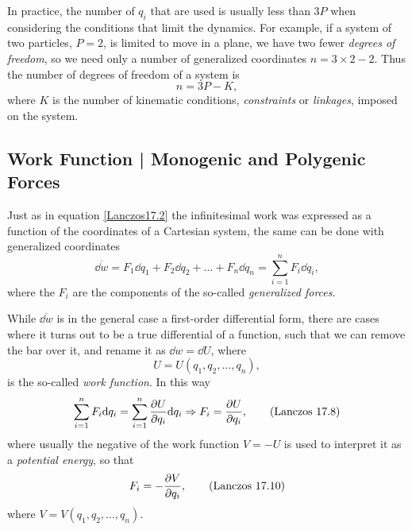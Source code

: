 \documentclass[12pt, spanish, a4paper, ]{article}
\begin{document}
In practice, the number of \(q_i\) that are used is usually less than \(3P\) when considering the conditions that limit the dynamics.
For example, if a system of two particles, \(P = 2\), is limited to move in a plane, we have two fewer \emph{degrees of freedom}, so we need only a number of generalized coordinates \(n= 3 \times 2 - 2\).
Thus the number of degrees of freedom of a system is 
\begin{equation}
	n = 3 P - K,
\end{equation}
where \(K\) is the number of kinematic conditions, \emph{constraints} or \emph{linkages}, imposed on the system.



\subsection{Work Function | Monogenic and Polygenic Forces}\label{workFunction}
Just as in equation \eqref{Lanczos17.2} the infinitesimal work was expressed as a function of the coordinates of a Cartesian system, the same can be done with generalized coordinates
\begin{equation}\label{Lanczos17.3}
	\overline{\dd w} = F_1 \dd q_1 + F_2 \dd q_2 + \ldots + F_n \dd q_n =  \displaystyle\sum_{i=1}^{n} F_{i} \dd q_i,
	\tag{Lanczos 17.3}
\end{equation}
where the \(F_i\) are the components of the so-called \emph{generalized forces}.

While \(\overline{\dd w}\) is in the general case a first-order differential form, there are cases where it turns out to be a true differential of a function, such that we can remove the bar over it, and rename it as \(\dd w= \dd U\), where
\begin{equation}\label{Lanczos17.6}
	U= U(q_1, q_2, \ldots, q_n),
	\tag{Lanczos 17.6}
\end{equation}
is the so-called \emph{work function}.
In this way
\begin{equation}\label{Lanczos17.8}
	\sum_{i=1}^{n} F_i \dd q_i = \sum_{i=1}^{n} \pdv{U}{q_i} \dd q_i 
	\Rightarrow F_i = \pdv{U}{q_i},
	\tag{Lanczos 17.8}
\end{equation}
where usually the negative of the work function \(V = - U\) is used to interpret it as a \emph{potential energy}, so that 
\begin{align}\label{Lanczos17.10}
	F_i = - \pdv{V}{q_i},
	\tag{Lanczos 17.10}
\end{align}
where \(V= V(q_1, q_2, \ldots, q_n)\).
\end{document}
